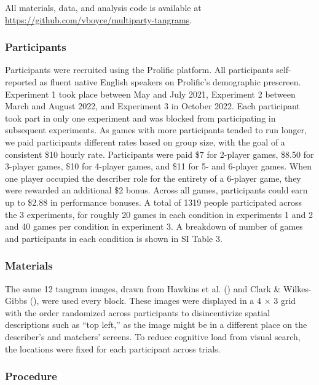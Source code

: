\documentclass[
  english,
]{article}
\begin{document}
All materials, data, and analysis code is available at \url{https://github.com/vboyce/multiparty-tangrams}.

\subsubsection{Participants}\label{participants}

Participants were recruited using the Prolific platform.
All participants self-reported as fluent native English speakers on Prolific's demographic prescreen.
Experiment 1 took place between May and July 2021, Experiment 2 between March and August 2022, and Experiment 3 in October 2022.
Each participant took part in only one experiment and was blocked from participating in subsequent experiments.
As games with more participants tended to run longer, we paid participants different rates based on group size, with the goal of a consistent \$10 hourly rate. Participants were paid \$7 for 2-player games, \$8.50 for 3-player games, \$10 for 4-player games, and \$11 for 5- and 6-player games. When one player occupied the describer role for the entirety of a 6-player game, they were rewarded an additional \$2 bonus. Across all games, participants could earn up to \$2.88 in performance bonuses. A total of 1319 people participated across the 3 experiments, for roughly 20 games in each condition in experiments 1 and 2 and 40 games per condition in experiment 3. A breakdown of number of games and participants in each condition is shown in SI Table 3.

\subsubsection{Materials}\label{materials}

The same 12 tangram images, drawn from Hawkins et al. () and Clark \& Wilkes-Gibbs (), were used every block.
These images were displayed in a 4 \(\times\) 3 grid with the order randomized across participants to disincentivize spatial descriptions such as ``top left,'' as the image might be in a different place on the describer's and matchers' screens.
To reduce cognitive load from visual search, the locations were fixed for each participant across trials.

\subsubsection{Procedure}\label{procedure}
\end{document}

